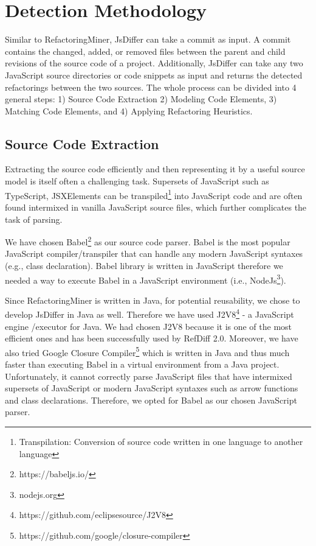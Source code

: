 \documentclass[letterpaper,12pt,onecolumn,final]{report}
\begin{document}
\section {Detection Methodology}

Similar to RefactoringMiner, JsDiffer can take a commit as input. A commit contains the changed, added, or removed files between the parent and child revisions of the source code of a project. Additionally, JsDiffer can take any two JavaScript source directories or code snippets as input and returns the detected refactorings between the two sources. The whole process can be divided into 4 general steps: 1) Source Code Extraction 2) Modeling Code Elements, 3) Matching Code Elements, and 4) Applying Refactoring Heuristics.


\subsection {Source Code Extraction}
Extracting the source code efficiently and then representing it by a useful source model is itself often a challenging task. Supersets of JavaScript such as TypeScript, JSXElements can be transpiled\footnote{Transpilation: Conversion of source code written in one language to another language} into JavaScript code and are often found intermixed in vanilla JavaScript source files, which further complicates the task of parsing.

We have chosen Babel\footnote{https://babeljs.io/} as our source code parser. Babel is the most popular JavaScript compiler/transpiler that can handle any modern JavaScript syntaxes (e.g., class declaration). Babel library is written in JavaScript therefore we needed a way to execute Babel in a JavaScript environment (i.e., NodeJs\footnote{nodejs.org}).

Since RefactoringMiner is written in Java, for potential reusability, we chose to develop JsDiffer in Java as well. Therefore we have used J2V8\footnote{https://github.com/eclipsesource/J2V8} - a JavaScript engine /executor for Java. We had chosen J2V8 because it is one of the most efficient ones and has been successfully used by RefDiff 2.0\cite{Silva2020}. Moreover, we have also tried Google Closure Compiler\footnote{https://github.com/google/closure-compiler} which is written in Java and thus much faster than executing Babel in a virtual environment from a Java project. Unfortunately, it cannot correctly parse JavaScript files that have intermixed supersets of JavaScript or modern JavaScript syntaxes such as arrow functions and class declarations. Therefore, we opted for Babel as our chosen JavaScript parser.
\end{document}

